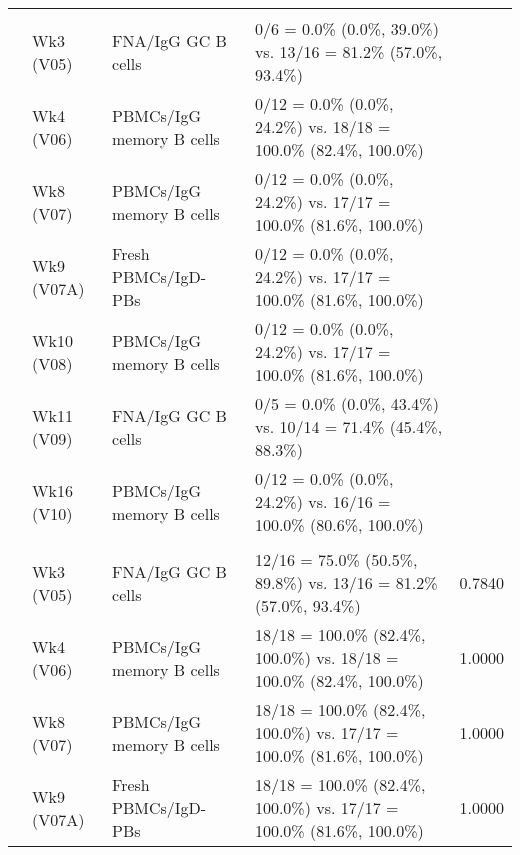 \documentclass[
]{article}
\begin{document}
\begin{table}[!h]
\begin{tabular}[t]{lllll}
\cmidrule{1-5}
\addlinespace[0.3em]
\multicolumn{5}{l}{\textbf{Placebo vs. 100µg}}\\
\hspace{1em} & Wk3 (V05) & FNA/IgG GC B cells & 0/6 = 0.0\% (0.0\%, 39.0\%) vs. 13/16 = 81.2\% (57.0\%, 93.4\%) & \cellcolor{yellow}{0.0007}\\
\cmidrule{2-5}
 & Wk4 (V06) & PBMCs/IgG memory B cells & 0/12 = 0.0\% (0.0\%, 24.2\%) vs. 18/18 = 100.0\% (82.4\%, 100.0\%) & \cellcolor{yellow}{<0.0001}\\
\cmidrule{2-5}
\hspace{1em} & Wk8 (V07) & PBMCs/IgG memory B cells & 0/12 = 0.0\% (0.0\%, 24.2\%) vs. 17/17 = 100.0\% (81.6\%, 100.0\%) & \cellcolor{yellow}{<0.0001}\\
\cmidrule{2-5}
\hspace{1em} & Wk9 (V07A) & Fresh PBMCs/IgD- PBs & 0/12 = 0.0\% (0.0\%, 24.2\%) vs. 17/17 = 100.0\% (81.6\%, 100.0\%) & \cellcolor{yellow}{<0.0001}\\
\cmidrule{2-5}
 & Wk10 (V08) & PBMCs/IgG memory B cells & 0/12 = 0.0\% (0.0\%, 24.2\%) vs. 17/17 = 100.0\% (81.6\%, 100.0\%) & \cellcolor{yellow}{<0.0001}\\
\cmidrule{2-5}
\hspace{1em} & Wk11 (V09) & FNA/IgG GC B cells & 0/5 = 0.0\% (0.0\%, 43.4\%) vs. 10/14 = 71.4\% (45.4\%, 88.3\%) & \cellcolor{yellow}{0.0059}\\
\cmidrule{2-5}
\hspace{1em} & Wk16 (V10) & PBMCs/IgG memory B cells & 0/12 = 0.0\% (0.0\%, 24.2\%) vs. 16/16 = 100.0\% (80.6\%, 100.0\%) & \cellcolor{yellow}{<0.0001}\\
\cmidrule{1-5}
\addlinespace[0.3em]
\multicolumn{5}{l}{\textbf{20µg vs. 100µg}}\\
\hspace{1em} & Wk3 (V05) & FNA/IgG GC B cells & 12/16 = 75.0\% (50.5\%, 89.8\%) vs. 13/16 = 81.2\% (57.0\%, 93.4\%) & 0.7840\\
\cmidrule{2-5}
\hspace{1em} & Wk4 (V06) & PBMCs/IgG memory B cells & 18/18 = 100.0\% (82.4\%, 100.0\%) vs. 18/18 = 100.0\% (82.4\%, 100.0\%) & 1.0000\\
\cmidrule{2-5}
\hspace{1em} & Wk8 (V07) & PBMCs/IgG memory B cells & 18/18 = 100.0\% (82.4\%, 100.0\%) vs. 17/17 = 100.0\% (81.6\%, 100.0\%) & 1.0000\\
\cmidrule{2-5}
\hspace{1em} & Wk9 (V07A) & Fresh PBMCs/IgD- PBs & 18/18 = 100.0\% (82.4\%, 100.0\%) vs. 17/17 = 100.0\% (81.6\%, 100.0\%) & 1.0000\\

\end{tabular}
\end{table}
\end{document}
